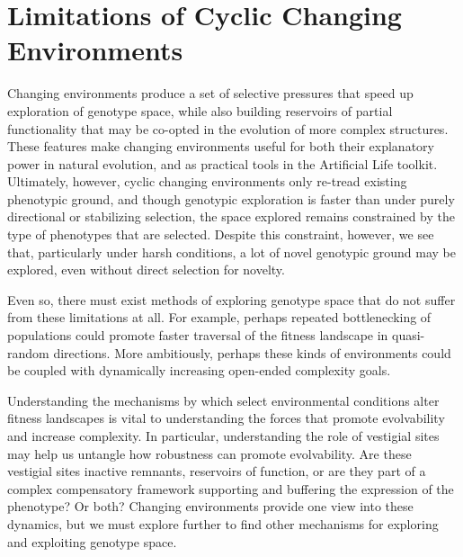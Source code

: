 \documentclass[PhD]{msu-thesis}
\begin{document}
\section{Limitations of Cyclic Changing Environments}
Changing environments produce a set of selective pressures that speed up exploration of genotype space, while also building reservoirs of partial functionality that may be co-opted in the evolution of more complex structures. These features make changing environments useful for both their explanatory power in natural evolution, and as practical tools in the Artificial Life toolkit.
Ultimately, however, cyclic changing environments only re-tread existing phenotypic ground, and though genotypic exploration is faster than under purely directional or stabilizing selection, the space explored remains constrained by the type of phenotypes that are selected. Despite this constraint, however, we see that, particularly under harsh conditions, a lot of novel genotypic ground may be explored, even without direct selection for novelty. 

Even so, there must exist methods of exploring genotype space that do not suffer from these limitations at all.
For example, perhaps repeated bottlenecking of populations could promote faster traversal of the fitness landscape in quasi-random directions. More ambitiously, perhaps these kinds of environments could be coupled with dynamically increasing open-ended complexity goals.

Understanding the mechanisms by which select environmental conditions alter fitness landscapes is vital to understanding the forces that promote evolvability and increase complexity. In particular, understanding the role of vestigial sites may help us untangle how robustness can promote evolvability. Are these vestigial sites inactive remnants, reservoirs of function, or are they part of a complex compensatory framework supporting and buffering the expression of the phenotype? Or both? Changing environments provide one view into these dynamics, but we must explore further to find other mechanisms for exploring and exploiting genotype space.
\end{document}
